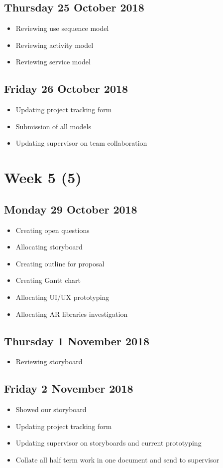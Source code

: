 \subsection*{Thursday 25 October 2018}
\begin{itemize}
	\item Reviewing use sequence model
	\item Reviewing activity model
	\item Reviewing service model 
\end{itemize}

\subsection*{Friday 26 October 2018}
\begin{itemize}
    \item Updating project tracking form
	\item Submission of all models
	\item Updating supervisor on team collaboration
\end{itemize}

\section*{Week 5 (5)}
\subsection*{Monday 29 October 2018}
\begin{itemize}
    \item Creating open questions
	\item Allocating storyboard
	\item Creating outline for proposal
	\item Creating Gantt chart
	\item Allocating UI/UX prototyping
	\item Allocating AR libraries investigation
\end{itemize}

\subsection*{Thursday 1 November 2018}
\begin{itemize}
	\item Reviewing storyboard
\end{itemize}

\subsection*{Friday 2 November 2018}
\begin{itemize}
    \item Showed our storyboard
    \item Updating project tracking form
	\item Updating supervisor on storyboards and current prototyping
	\item Collate all half term work in one document and send to supervisor
\end{itemize}

